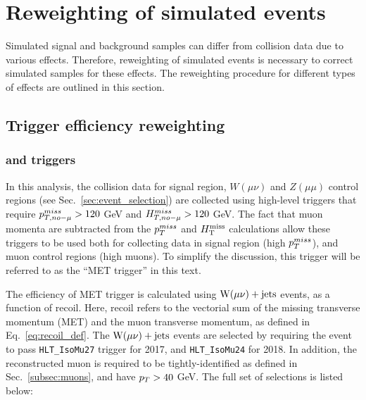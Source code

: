 \section{Reweighting of simulated events} \label{sec:reweighting}

\graphicspath{{3_DataAnalysisStrategy/Figures}}

Simulated signal and background samples can differ from collision data due to
various effects. Therefore, reweighting of simulated events is necessary to correct
simulated samples for these effects. The reweighting procedure for different types of 
effects are outlined in this section.

\subsection{Trigger efficiency reweighting}
\label{subsec:trigger_eff_reweighting}

\subsubsection{\ptmissnomu and \htmissnomu triggers}
\label{subsubsec:met_trigger_eff}

In this analysis, the collision data for signal region, $W(\mu \nu)$ and $Z(\mu \mu)$ 
control regions (see Sec.~\ref{sec:event_selection}) are collected using high-level triggers 
that require $p_{T,no-\mu}^{miss} > 120$ GeV
and $H_{T,no-\mu}^{miss} > 120$ GeV. The fact that muon momenta are subtracted
from the $p_T^{miss}$ and $H_{\mathrm{T}}^{\mathrm{miss}}$ calculations allow these triggers to be used both for collecting data in
signal region (high $p_T^{miss}$), and muon control regions (high \pt muons).
To simplify the discussion, this trigger will be referred to as the ``MET trigger'' in this text.

The efficiency of MET trigger is calculated using $\mathrm{W}(\mu\nu)+\textrm{jets}$ events, as a function of recoil.
Here, recoil refers to the vectorial sum of the missing transverse momentum (MET) and the muon transverse momentum,
as defined in Eq.~\ref{eq:recoil_def}. The $\mathrm{W}(\mu\nu)+\textrm{jets}$ events are selected by requiring 
the event to pass \texttt{HLT\_IsoMu27} trigger for 2017, and \texttt{HLT\_IsoMu24} 
for 2018. In addition, the reconstructed muon is required to be tightly-identified as defined in Sec.~\ref{subsec:muons}, 
and have $p_T > 40$ GeV. The full set of selections is listed below:

